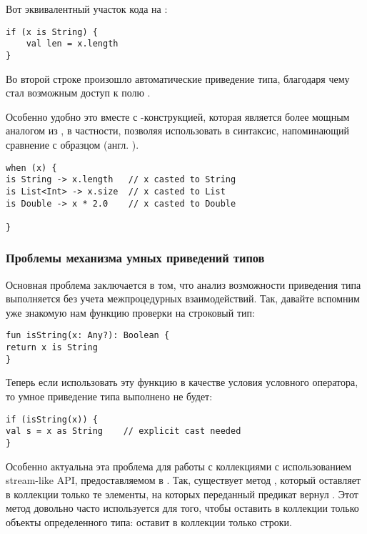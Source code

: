 Вот эквивалентный участок кода на : 

\begin{verbatim}
if (x is String) {
    val len = x.length
}
\end{verbatim}

Во второй строке произошло автоматические приведение типа, благодаря чему стал возможным доступ к полю .

Особенно удобно это вместе с -конструкцией, которая является более мощным аналогом  из , в частности, позволяя использовать в  синтаксис, напоминающий сравнение с образцом (англ. ).

\begin{verbatim}
when (x) {
is String -> x.length   // x casted to String
is List<Int> -> x.size  // x casted to List
is Double -> x * 2.0    // x casted to Double

}
\end{verbatim}




\subsubsection{Проблемы механизма умных приведений типов}

Основная проблема заключается в том, что анализ возможности приведения типа выполняется без учета межпроцедурных взаимодействий. Так, давайте вспомним уже знакомую нам функцию проверки на строковый тип:

\begin{verbatim}
fun isString(x: Any?): Boolean {
return x is String
}
\end{verbatim}

Теперь если использовать эту функцию в качестве условия условного оператора, то умное приведение типа выполнено не будет:

\begin{verbatim}
if (isString(x)) {
val s = x as String    // explicit cast needed
}
\end{verbatim}

Особенно актуальна эта проблема для работы с коллекциями с использованием stream-like API, предоставляемом в . Так, существует метод , который оставляет в коллекции только те элементы, на которых переданный предикат вернул . Этот метод довольно часто используется для того, чтобы оставить в коллекции только объекты определенного типа:  оставит в коллекции  только строки.

